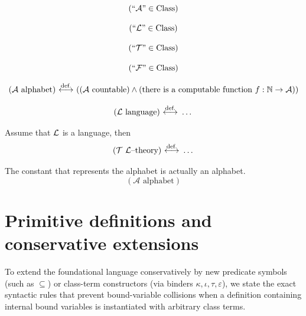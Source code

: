 

\begin{constructor*}
\[
(``\mathcal{A}"\in{\text{Class}})
\]
\end{constructor*}
\begin{constructor*}
\[
(``\mathcal{L}"\in{\text{Class}})
\]
\end{constructor*}
\begin{constructor*}
\[
(``\mathcal{T}"\in{\text{Class}})
\]
\end{constructor*}
\begin{constructor*}
\[
(``\mathcal{F}"\in{\text{Class}})
\]
\end{constructor*}
\begin{definition}
\[
({\mathcal{A}} \text{ alphabet})
\ {\stackrel{{\textrm{def.}}}{\longleftrightarrow}}\ 
(
({\mathcal{A}}\text{ countable})
\land
(\text{there is a computable function }f:\mathbb{N}\to{\mathcal{A}})
)
\]
\end{definition}

\begin{definition}
\[
({\mathcal{L}}\text{ language})\ {\stackrel{{\textrm{def.}}}{\longleftrightarrow}}\  \dots
\]
\end{definition}
\begin{definition}
Assume that ${\mathcal{L}}$ is a language, then
\[
(\mathcal{T} \text{ ${\mathcal{L}}$--theory})\ {\stackrel{{\textrm{def.}}}{\longleftrightarrow}}\  \dots
\]
\end{definition}
\begin{axiom*}%
The constant that represents the alphabet is actually an alphabet.
\[
(\mathcal{A}\text{ alphabet})
\]
\end{axiom*}
\fi %

\section{Primitive definitions and conservative extensions}
\label{subsec:primitive_definitions_completed}

To extend the foundational language conservatively by new predicate symbols (such as $\subseteq$) or class-term constructors (via binders $\kappa, \iota, \tau, \varepsilon$), we state the exact syntactic rules that prevent bound-variable collisions when a definition containing internal bound variables is instantiated with arbitrary class terms.

